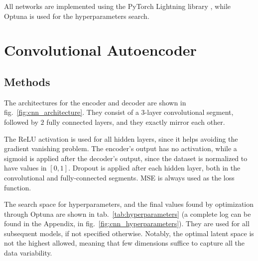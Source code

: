 \documentclass[11pt,a4paper]{scrartcl}
\begin{document}
\medskip

All networks are implemented using the PyTorch Lightning library \cite{pytorch_lightning}, while Optuna \cite{optuna} is used for the hyperparameters search. 



\section{Convolutional Autoencoder \label{sec:cnn_autoencoder}}
\subsection{Methods}
The architectures for the encoder and decoder are shown in fig.~\ref{fig:cnn_architecture}. They consist of a $3$-layer convolutional segment, followed by $2$ fully connected layers, and they exactly mirror each other. 

The ReLU activation is used for all hidden layers, since it helps avoiding the gradient vanishing problem. The encoder's output has no activation, while a sigmoid is applied after the decoder's output, since the dataset is normalized to have values in $[0,1]$. Dropout is applied after each hidden layer, both in the convolutional and fully-connected segments. MSE is always used as the loss function.

\medskip

The search space for hyperparameters, and the final values found by optimization through Optuna are shown in tab.~\ref{tab:hyperparameters} (a complete log can be found in the Appendix, in fig.~\ref{fig:cnn_hyperparameters}).
They are used for all subsequent models, if not specified otherwise. Notably, the optimal latent space is not the highest allowed, meaning that few dimensions suffice to capture all the data variability. 
\end{document}

